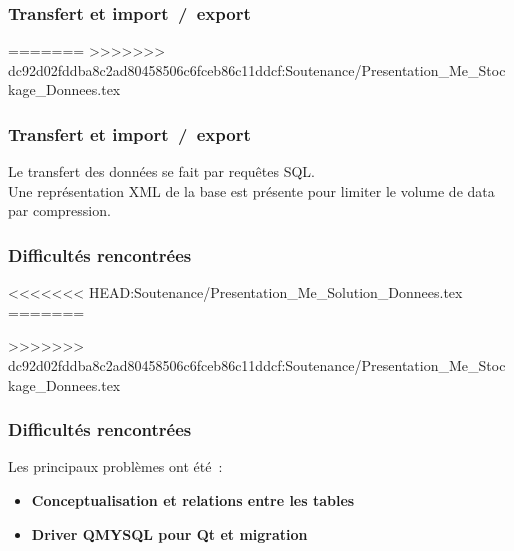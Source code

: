 \subsubsection[Transfert et import~/~export]{Transfert et import~/~export}
=======
>>>>>>> dc92d02fddba8c2ad80458506c6fceb86c11ddcf:Soutenance/Presentation_Me_Stockage_Donnees.tex
\begin{frame}
\frametitle{Transfert et import~/~export}
Le transfert des données se fait par requêtes SQL.\\
Une représentation XML de la base est présente pour limiter le volume de data par compression.\\
\end{frame}

\subsubsection{Difficultés rencontrées}
<<<<<<< HEAD:Soutenance/Presentation_Me_Solution_Donnees.tex
=======

>>>>>>> dc92d02fddba8c2ad80458506c6fceb86c11ddcf:Soutenance/Presentation_Me_Stockage_Donnees.tex
\begin{frame}
\frametitle{Difficultés rencontrées}
Les principaux problèmes ont été~:
\begin{itemize}
\item<2-> \textbf{Conceptualisation et relations entre les tables}
\item<3-> \textbf{Driver QMYSQL pour Qt et migration}
\end{itemize}
\end{frame}
